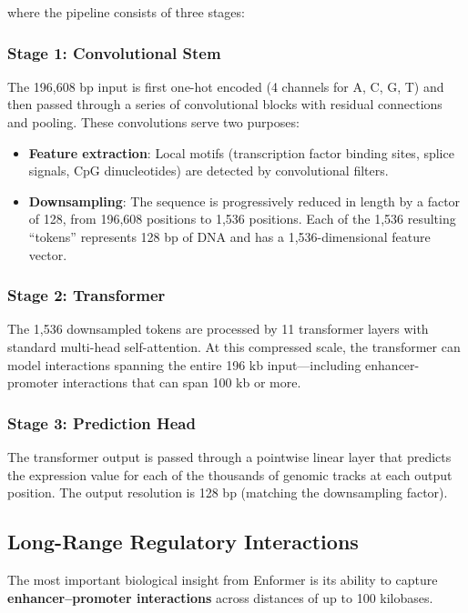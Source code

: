 where the pipeline consists of three stages:

\subsubsection{Stage 1: Convolutional Stem}

The 196,608 bp input is first one-hot encoded (4 channels for A, C, G, T) and then passed through a series of convolutional blocks with residual connections and pooling. These convolutions serve two purposes:
\begin{itemize}[leftmargin=1.5em]
  \item \textbf{Feature extraction}: Local motifs (transcription factor binding sites, splice signals, CpG dinucleotides) are detected by convolutional filters.
  \item \textbf{Downsampling}: The sequence is progressively reduced in length by a factor of 128, from 196,608 positions to 1,536 positions. Each of the 1,536 resulting ``tokens'' represents 128 bp of DNA and has a 1,536-dimensional feature vector.
\end{itemize}

\subsubsection{Stage 2: Transformer}

The 1,536 downsampled tokens are processed by 11 transformer layers with standard multi-head self-attention. At this compressed scale, the transformer can model interactions spanning the entire 196 kb input---including enhancer-promoter interactions that can span 100 kb or more.

\subsubsection{Stage 3: Prediction Head}

The transformer output is passed through a pointwise linear layer that predicts the expression value for each of the thousands of genomic tracks at each output position. The output resolution is 128 bp (matching the downsampling factor).

\subsection{Long-Range Regulatory Interactions}

The most important biological insight from Enformer is its ability to capture \textbf{enhancer--promoter interactions} across distances of up to 100 kilobases.


